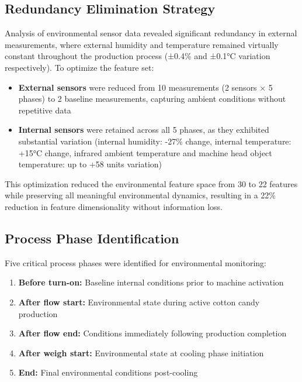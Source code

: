\subsection{Redundancy Elimination Strategy}


Analysis of environmental sensor data revealed significant redundancy in external measurements, where external humidity and temperature remained virtually constant throughout the production process (±0.4\% and ±0.1°C variation respectively). To optimize the feature set:

\begin{itemize}
    \item \textbf{External sensors} were reduced from 10 measurements (2 sensors × 5 phases) to 2 baseline measurements, capturing ambient conditions without repetitive data
    \item \textbf{Internal sensors} were retained across all 5 phases, as they exhibited substantial variation (internal humidity: -27\% change, internal temperature: +15°C change, infrared ambient temperature and machine head object temperature: up to +58 units variation)
\end{itemize}

This optimization reduced the environmental feature space from 30 to 22 features while preserving all meaningful environmental dynamics, resulting in a 22\% reduction in feature dimensionality without information loss.

\subsection{Process Phase Identification}

Five critical process phases were identified for environmental monitoring:

\begin{enumerate}
    \item \textbf{Before turn-on:} Baseline internal conditions prior to machine activation
    \item \textbf{After flow start:} Environmental state during active cotton candy production
    \item \textbf{After flow end:} Conditions immediately following production completion
    \item \textbf{After weigh start:} Environmental state at cooling phase initiation
    \item \textbf{End:} Final environmental conditions post-cooling
\end{enumerate}

